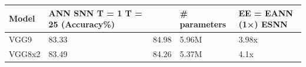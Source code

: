 \begin{tabular}{lllll}
\toprule
Model & ANN SNN T = 1 T = 25 (Accuracy\%) &  & \# parameters & EE = EANN (1×) ESNN \\
\midrule
VGG9 & 83.33 & 84.98 & 5.96M & 3.98x \\
VGG8x2 & 83.49 & 84.26 & 5.37M & 4.1x \\
\bottomrule
\end{tabular}
